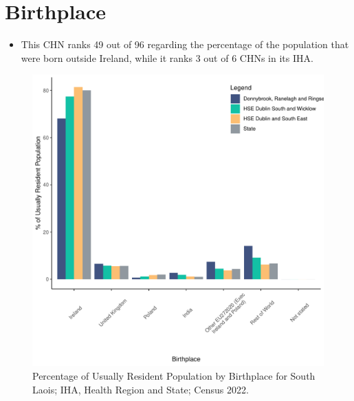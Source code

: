 \documentclass{article}
\begin{document}
\section{Birthplace}\label{sect:Birth}
\begin{itemize}
\item This CHN ranks  49 out of 96 regarding the percentage of the population that were born outside Ireland, while it ranks  3 out of 6 CHNs in its IHA.
\end{itemize}
\begin{figure}[H]
	\centering
	\includegraphics[width = 130mm]{../figures/BirthED.pdf}
	\caption{Percentage of Usually Resident Population by Birthplace for South Laois; IHA, Health Region and State; Census 2022.}
	\label{fig:vbnv}
	\end{figure}
	
\end{document}
